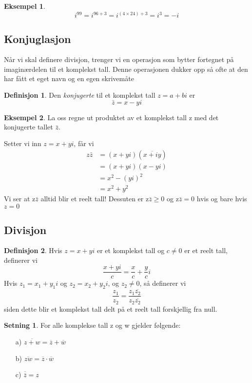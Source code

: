 \documentclass[11pt]{article}
\theoremstyle{definition}
\newtheorem{mindef}{Definisjon}[section]
\newenvironment{fmindef}
{\begin{mdframed}[style=minstil]\begin{mindef}}
		{\end{mindef}\end{mdframed}}
\theoremstyle{definition}
\newtheorem{mitteks}{Eksempel}[section]
\newenvironment{fmitteks}
{\begin{mdframed}[style=minstil]\begin{mitteks}}
		{\end{mitteks}\end{mdframed}}
\theoremstyle{definition}
\newtheorem{minset}{Setning}[section]
\newenvironment{fminset}
{\begin{mdframed}[style=minstil]\begin{minset}}
		{\end{minset}\end{mdframed}}
\theoremstyle{definition}
\theoremstyle{definition}
\theoremstyle{definition}
\begin{document}
	\begin{fmitteks}
		\[i^{99}=i^{96+3}=i^{(4\times 24)+3}=i^3=-i\]
	\end{fmitteks}
	
	\newpage
	
	\subsection{Konjuglasjon}
	
	Når vi skal definere divisjon, trenger vi en operasjon som bytter fortegnet på imaginærdelen til et komplekst tall. Denne operasjonen dukker opp så ofte at den har fått et eget navn og en egen skrivemåte
	
	\begin{fmindef}
		Den \textit{konjugerte} til et komplekst tall \(z=a+bi\) er \[\bar{z}=x-yi\]
	\end{fmindef}
	
	\begin{fmitteks}
			La oss regne ut produktet av et komplekst tall z med det konjugerte tallet \(\bar{z}\).
			
			Setter vi inn \(z=x+yi\), får vi
			\begin{align*}
				z\bar{z}&=(x+yi)(\overline{x+iy}) \\
				&= (x+yi)(x-yi)                   \\
				&= x^2-(yi)^2                     \\
				&= x^2+y^2       
			\end{align*}
			Vi ser at z\(\bar{z}\) alltid blir et reelt tall! Dessuten er z\(\bar{z}\geq 0\) og z\(\bar{z} = 0\) hvis og bare hvis \(z=0\)
	\end{fmitteks}
	
	\newpage
	
	\subsection{Divisjon}
	
	\begin{fmindef}
		Hvis \(z=x+yi\) er et komplekst tall og \(c\neq 0\) er et reelt tall, definerer vi \[\dfrac{x+yi}{c}=\frac{x}{c}+\frac{y}{c}i\]
		Hvis \(z_1=x_1+y_1i\) og \(z_2=x_2+y_2i\), og \(z_2\neq 0\), så definerer vi
		 \[ \frac{z_1}{z_2}=\frac{z_1\overline{z_2}}{z_2\overline{z_2}} \]
		 siden dette blir et komplekst tall delt på et reelt tall forskjellig fra null.
	\end{fmindef}
	
	\begin{fminset}
		For alle komplekse tall z og w gjelder følgende: \\
        \begin{enumerate}
        	\item[a)] \(\overline{z+w}=\overline{z} + \overline{w}\)
        	
        	\item[b)] \(\overline{zw} = \overline{z} \cdot \overline{w} \)
        	
        	\item[c)] \( \overline{\overline{z}}=z  \)
        \end{enumerate}
	\end{fminset}
	
\end{document}
